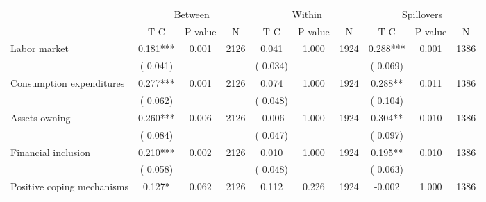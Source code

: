
\begin{tabular}{l*{9}{c}}\hline&\multicolumn{3}{c}{Between}&\multicolumn{3}{c}{Within}&\multicolumn{3}{c}{Spillovers} \\ \cmidrule(r){2-4}\cmidrule(l){5-7}\cmidrule(l){8-10} & {T-C} & {P-value} & {N} & {T-C} & {P-value} & {N}  & {T-C} & {P-value} & {N}  \\ \midrule
 Labor market                 &              0.181***          &        0.001 & 2126          &              0.041          &        1.000 & 1924          &        0.288*** &        0.001 & 1386                 \\ 
                               &        (       0.041) & &                                                                 &       (       0.034) & &                                                          &       (       0.069)      & &     \\ 
 Consumption expenditures                 &              0.277***          &        0.001 & 2126          &              0.074 &        1.000 & 1924                   &        0.288** &        0.011 & 1386                 \\ 
                               &        (       0.062) & &                                                                 &       (       0.048) & &                                                          &       (       0.104) & &  \\ 
 Assets owning                 &              0.260***          &        0.006 & 2126          &             -0.006 &        1.000 & 1924                   &        0.304** &        0.010 & 1386                 \\ 
                               &        (       0.084) & &                                                                 &       (       0.047) & &                                                          & (       0.097)                                    \\ 
 Financial inclusion                 &              0.210***          &        0.002 & 2126          &              0.010 &        1.000 & 1924                   &        0.195** &        0.010 & 1386                 \\ 
                               &        (       0.058) & &                                                                 &       (       0.048) & &                                                          &       (       0.063) & &   \\ 
 Positive coping mechanisms                 &              0.127*          &        0.062 & 2126          &              0.112 &        0.226 & 1924                   &       -0.002 &        1.000 & 1386                 \\ 

\end{tabular}
